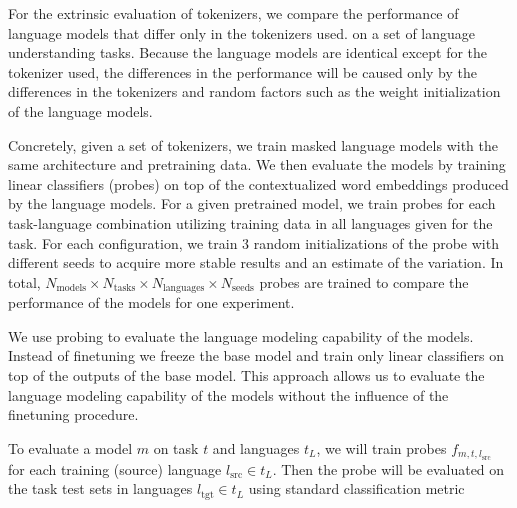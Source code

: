 For the extrinsic evaluation of  tokenizers, we compare the performance of  language models that differ only in the tokenizers used.
 on a set of language understanding tasks.
Because the language models are identical except for the tokenizer used, the differences in the performance will be caused only by the differences in the tokenizers and random factors such as the weight initialization of the language models.

Concretely, given a set of tokenizers, we train  masked language models with the same architecture and pretraining data.
 We then evaluate the models by training linear classifiers (probes) on top of the contextualized word embeddings produced by the language models. 
 For a given pretrained model, we train probes for each task-language combination utilizing training data in all languages given for the task.
 For each configuration, we train 3 random initializations of the probe with different seeds to acquire more stable results and an estimate of the variation. In total, $N_\mathrm{models} \times N_\mathrm{tasks} \times N_\mathrm{languages} \times N_\mathrm{seeds}$ probes are trained to compare the performance of the models for one experiment.

We use probing \cite{conneau_what_2018,belinkov_interpretability_2020,blevins_analyzing_2022} to evaluate the language modeling capability of the models. Instead of finetuning we freeze the base model and train only linear classifiers on top of the outputs of the base model. This approach allows us to evaluate the language modeling capability of the models without the influence of the finetuning procedure. 


To evaluate a model $m$ on task $t$ and languages $t_L$, we will train probes $f_{m, t, l_\mathrm{src}}$ for each training (source) language $l_\mathrm{src} \in t_L$. Then the probe will be evaluated on the task test sets in languages $l_\mathrm{tgt} \in t_L$ using standard classification metric  

